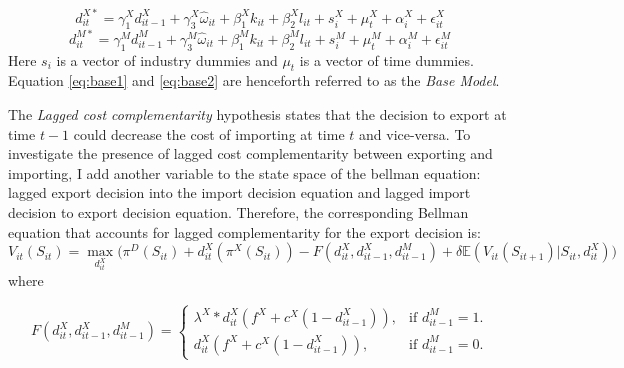 \documentclass[12pt]{article}
\begin{document}

\begin{equation}
\label{eq:base1}
d_{it}^{X*} = \gamma_{1}^{X} d_{it-1}^{X} + 
\gamma_{3}^{X} \hat{\omega}_{it}  + \beta_{1}^{X}k_{it}  +\beta_{2}^{X}l_{it}+
s_{i}^{X} + \mu_{t}^{X}  + \alpha_{i}^{X}+\epsilon_{it}^{X}
\end{equation}
\begin{equation}
\label{eq:base2}
d_{it}^{M*} = \gamma_{1}^{M} d_{it-1}^{M} + 
\gamma_{3}^{M} \hat{\omega}_{it}  + \beta_{1}^{M}k_{it}  +\beta_{2}^{M}l_{it}+
s_{i}^{M} + \mu_{t}^{M}  + \alpha_{i}^{M}+\epsilon_{it}^{M}
\end{equation}
Here $s_{i}$ is a vector of industry dummies and $\mu_{t}$ is a vector
of time dummies. Equation \ref{eq:base1} and \ref{eq:base2} are
 henceforth referred to as the \textit{Base Model}.  






The \textit{Lagged cost complementarity} hypothesis states that the
decision to export at time $t-1$  could decrease the cost of importing at
time $t$ and vice-versa. To investigate the presence of lagged cost complementarity between exporting and
importing, I add another variable to the state space of the bellman equation: lagged export
decision into the import decision equation and lagged import decision
to export decision equation. Therefore, the  corresponding Bellman equation that
accounts for lagged complementarity for the export decision is: 
\begin{equation}
\label{eq:belllagex}
V_{it}(S_{it})= \underset{d_{it}^{X}}{\max} \Big(\pi^{D}(S_{it}) + d_{it}^{X}(\pi^{X}(S_{it})) - F(d_{it}^{X},d_{it-1}^{X}, d_{it-1}^{M})
  + \delta \mathbb{E} (V_{it}(S_{it+1})|S_{it}, d_{it}^{X}) \Big)
\end{equation}
where 
 
\begin{equation}
  F(d_{it}^{X},d_{it-1}^{X}, d_{it-1}^{M})=\begin{cases}
   \lambda^{X} * d_{it}^{X}( f^{X} +c^{X}(1-d_{it-1}^{X})), & \text{if $d_{it-1}^{M}= 1$}.\\
   d_{it}^{X}( f^{X} +c^{X}(1-d_{it-1}^{X})) , & \text{if $d_{it-1}^{M}= 0$}.
  \end{cases}
\end{equation}
\end{document}
